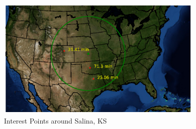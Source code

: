 \begin{figure}
    \centering
    \includegraphics[width = 10cm]{Thesis/Method/IntPtsFigure.eps}
    \caption{Interest Points around Salina, KS}
    \label{fig:intPtsMap}
\end{figure}
